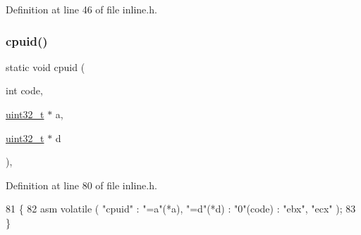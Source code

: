 Definition at line 46 of file inline.\+h.


\mbox{\label{a00077_adacb2a50c30267ac5314bfcb92ac1d85_adacb2a50c30267ac5314bfcb92ac1d85}} 
\subsubsection{\texorpdfstring{cpuid()}{cpuid()}}
{\footnotesize\ttfamily static void cpuid (\begin{DoxyParamCaption}\item[{int}]{code,  }\item[{\hyperlink{a00068_a435d1572bf3f880d55459d9805097f62_a435d1572bf3f880d55459d9805097f62}{uint32\+\_\+t} $\ast$}]{a,  }\item[{\hyperlink{a00068_a435d1572bf3f880d55459d9805097f62_a435d1572bf3f880d55459d9805097f62}{uint32\+\_\+t} $\ast$}]{d }\end{DoxyParamCaption})\hspace{0.3cm}{\ttfamily [inline]}, {\ttfamily [static]}}



Definition at line 80 of file inline.\+h.


\begin{DoxyCode}
81 \{
82     \textcolor{keyword}{asm} \textcolor{keyword}{volatile} ( \textcolor{stringliteral}{"cpuid"} : \textcolor{stringliteral}{"=a"}(*a), \textcolor{stringliteral}{"=d"}(*d) : \textcolor{stringliteral}{"0"}(code) : \textcolor{stringliteral}{"ebx"}, \textcolor{stringliteral}{"ecx"} );
83 \}
\end{DoxyCode}
\mbox{\label{a00077_aee0779a0581136320f91a72c4d6b5b90_aee0779a0581136320f91a72c4d6b5b90}} 
